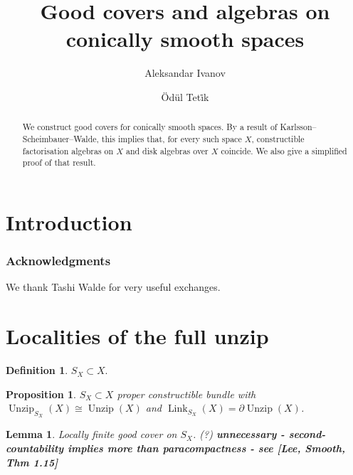 \documentclass[]{amsart}
\title{{Good covers and algebras on conically smooth spaces}}
\author{Aleksandar Ivanov}
\author{\"Od\"ul Tet\.{i}k}
\date{}
\DeclareMathOperator{\Unzip}{Unzip}
\DeclareMathOperator{\Link}{Link}
\numberwithin{equation}{section}
\theoremstyle{definition}
\newtheorem{definition}[equation]{Definition}%
\theoremstyle{remark}
\theoremstyle{plain}
\newtheorem{proposition}[equation]{Proposition}
\newtheorem{lemma}[equation]{Lemma}
\begin{document}
\maketitle

\begin{abstract}
    We construct good covers for conically smooth spaces. By a result of Karlsson--Scheimbauer--Walde, this implies that, for every such space $X$, constructible factorisation algebras on $X$ and disk algebras over $X$ coincide. We also give a simplified proof of that result.
\end{abstract}



\tableofcontents

\section{Introduction}

\subsubsection*{Acknowledgments} We thank Tashi Walde for very useful exchanges.

\section{Localities of the full unzip}


\begin{definition}
    $S_X\subset X$.
\end{definition}

\begin{proposition}\label{7GBVGBA}
    $S_X\subset X$ proper constructible bundle with $\Unzip_{S_X}(X)\cong\Unzip(X)$ and $\Link_{S_X}(X)=\partial\Unzip(X)$.
\end{proposition}


\begin{lemma}\label{DNFREG0}
    {\color{gray}Locally finite good cover on $S_X$. (?)} {\bf unnecessary - second-countability implies more than paracompactness - see [Lee, Smooth, Thm 1.15]}
\end{lemma}
\end{document}
